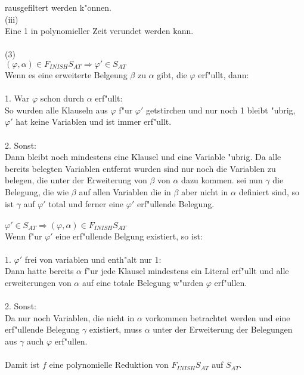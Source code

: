\documentclass{article}
\newcommand{\Ra}{\Rightarrow}
\renewcommand{\phi}{\varphi}
\begin{document}
    rausgefiltert werden k"onnen.\\
(iii)\\
Eine 1 in polynomieller Zeit verundet werden kann.\\
\\
(3)\\
$(\phi, \alpha) \in F_{INISH}S_{AT} \Ra \phi' \in S_{AT}$\\
Wenn es eine erweiterte Belgeung $\beta$ zu $\alpha$ gibt, die $\phi$ erf"ullt,
    dann:\\
\\
1. War $\phi$ schon durch $\alpha$ erf"ullt:\\
    So wurden alle Klauseln aus $\phi$ f"ur $\phi'$ getstirchen und nur noch
    1 bleibt "ubrig, $\phi'$ hat keine Variablen und ist immer erf"ullt.\\
\\
2. Sonst:\\
    Dann bleibt noch mindestens eine Klausel und eine Variable "ubrig. Da alle 
    bereits belegten Variablen entfernt wurden sind nur noch die Variablen zu
    belegen, die unter der Erweiterung von $\beta$ von $\alpha$ dazu kommen.
    sei nun $\gamma$ die Belegung, die wie $\beta$ auf allen Variablen die 
    in $\beta$ aber nicht in $\alpha$ definiert sind, so ist $\gamma$ auf
    $\phi'$ total und ferner eine $\phi'$ erf"ullende Belegung.\\
\\
$\phi' \in S_{AT} \Ra (\phi, \alpha) \in F_{INISH}S_{AT}$\\
Wenn f"ur $\phi'$ eine erf"ullende Belgung existiert, so ist:\\
\\
1. $\phi'$ frei von variablen und enth"alt nur 1:\\
    Dann hatte bereits $\alpha$ f"ur jede Klausel mindestens ein Literal 
    erf"ullt und alle erweiterungen von $\alpha$ auf eine totale Belegung
    w"urden $\phi$ erf"ullen.\\
\\
2. Sonst:\\
    Da nur noch Variablen, die nicht in $\alpha$ vorkommen betrachtet werden
    und eine erf"ullende Belegung $\gamma$ existiert, 
    muss $\alpha$ unter der Erweiterung
    der Belegungen aus $\gamma$ auch $\phi$ erf"ullen.\\
\\
Damit ist $f$ eine polynomielle Reduktion von $F_{INISH}S_{AT}$ auf $S_{AT}$.\\
\end{document}
